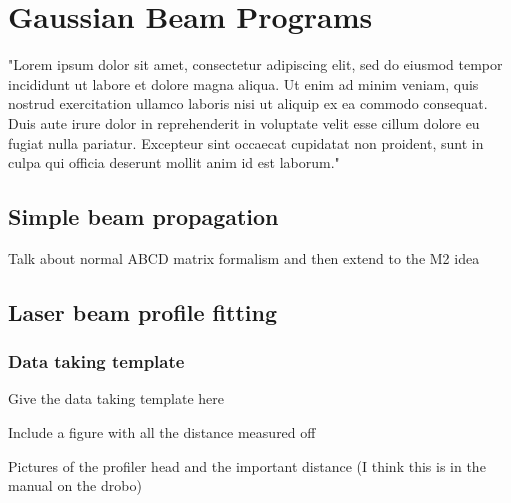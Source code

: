 \chapter{Gaussian Beam Programs}
"Lorem ipsum dolor sit amet, consectetur adipiscing elit, sed do eiusmod tempor incididunt ut labore et dolore magna aliqua. Ut enim ad minim veniam, quis nostrud exercitation ullamco laboris nisi ut aliquip ex ea commodo consequat. Duis aute irure dolor in reprehenderit in voluptate velit esse cillum dolore eu fugiat nulla pariatur. Excepteur sint occaecat cupidatat non proident, sunt in culpa qui officia deserunt mollit anim id est laborum."

\section{Simple beam propagation}
Talk about normal ABCD matrix formalism and then extend to the M2 idea

\section{Laser beam profile fitting}
\subsection{Data taking template}
Give the data taking template here

Include a figure with all the distance measured off

Pictures of the profiler head and the important distance (I think this is in the manual on the drobo)

